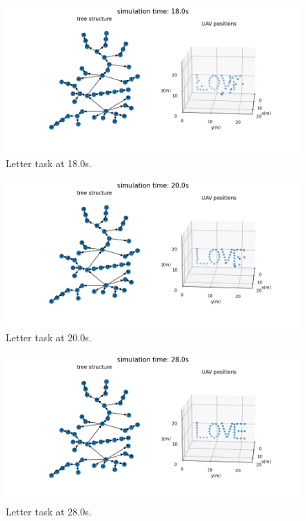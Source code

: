 \begin{figure}[htbp]
  \centering
  \includegraphics[width=0.96\linewidth]{rsc/lttr.13.png}
  \caption{Letter task at 18.0s.}
  \label{fig:sim_lttr_180}
\end{figure}

\begin{figure}[htbp]
  \centering
  \includegraphics[width=0.96\linewidth]{rsc/lttr.14.png}
  \caption{Letter task at 20.0s.}
  \label{fig:sim_lttr_200}
\end{figure}

\begin{figure}[htbp]
  \centering
  \includegraphics[width=0.96\linewidth]{rsc/lttr.18.png}
  \caption{Letter task at 28.0s.}
  \label{fig:sim_lttr_280}
\end{figure}

